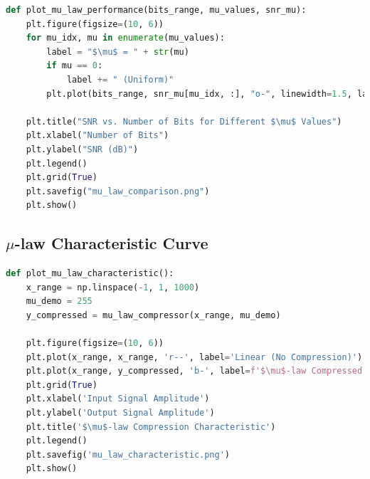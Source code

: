 \documentclass{article}
\begin{document}
\begin{lstlisting}[language=Python, caption=$\mu$-law  Visualization]
def plot_mu_law_performance(bits_range, mu_values, snr_mu):
    plt.figure(figsize=(10, 6))
    for mu_idx, mu in enumerate(mu_values):
        label = "$\mu$ = " + str(mu)
        if mu == 0:
            label += " (Uniform)"
        plt.plot(bits_range, snr_mu[mu_idx, :], "o-", linewidth=1.5, label=label)

    plt.title("SNR vs. Number of Bits for Different $\mu$ Values")
    plt.xlabel("Number of Bits")
    plt.ylabel("SNR (dB)")
    plt.legend()
    plt.grid(True)
    plt.savefig("mu_law_comparison.png")
    plt.show()
\end{lstlisting}

\subsection{$\mu$-law Characteristic Curve}

\begin{lstlisting}[language=Python, caption=$\mu$-law Characteristic Curve]
def plot_mu_law_characteristic():
    x_range = np.linspace(-1, 1, 1000)
    mu_demo = 255
    y_compressed = mu_law_compressor(x_range, mu_demo)
    
    plt.figure(figsize=(10, 6))
    plt.plot(x_range, x_range, 'r--', label='Linear (No Compression)')
    plt.plot(x_range, y_compressed, 'b-', label=f'$\mu$-law Compressed ($\mu$={mu_demo})')
    plt.grid(True)
    plt.xlabel('Input Signal Amplitude')
    plt.ylabel('Output Signal Amplitude')
    plt.title('$\mu$-law Compression Characteristic')
    plt.legend()
    plt.savefig('mu_law_characteristic.png')
    plt.show()
\end{lstlisting}
\end{document}
